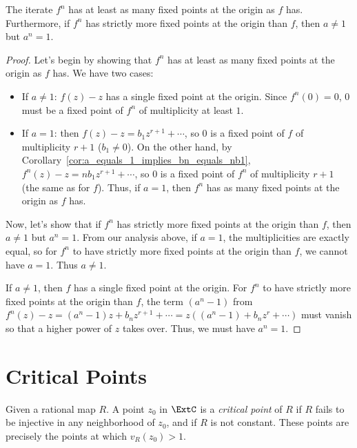 \begin{corollary}
    The iterate $f^n$ has at least as many fixed points at the origin as $f$
    has. Furthermore, if $f^n$ has strictly more fixed points at the origin than
    $f$, then $a \neq 1$ but $a^n = 1$.
\end{corollary}
\begin{proof}
    Let's begin by showing that $f^n$ has at least as many fixed points at the
    origin as $f$ has. We have two cases:
    \begin{itemize}
        \item If $a \neq 1$: $f(z) - z$ has a single fixed point at the origin.
        Since $f^n(0) = 0$, $0$ must be a fixed point of $f^n$ of multiplicity
        at least $1$.
        \item If $a = 1$: then $f(z) - z = b_1 z^{r+1} + \cdots$, so $0$ is a
        fixed point of $f$ of multiplicity $r + 1$ ($b_1 \neq 0$). On the other
        hand, by Corollary~\ref{cor:a_equals_1_implies_bn_equals_nb1}, $f^n(z) -
        z = n b_1 z^{r+1} + \cdots$, so $0$ is a fixed point of $f^n$ of
        multiplicity $r + 1$ (the same as for $f$). Thus, if $a = 1$, then $f^n$
        has as many fixed points at the origin as $f$ has.
    \end{itemize}

    Now, let's show that if $f^n$ has strictly more fixed points at the origin
    than $f$, then $a \neq 1$ but $a^n = 1$. From our analysis above, if $a =
    1$, the multiplicities are exactly equal, so for $f^n$ to have strictly more
    fixed points at the origin than $f$, we cannot have $a = 1$. Thus $a \neq
    1$.

    If $a \neq 1$, then $f$ has a single fixed point at the origin. For $f^n$ to
    have strictly more fixed points at the origin than $f$, the term $(a^n - 1)$
    from $f^n(z) - z = (a^n - 1)z + b_n z^{r+1} + \cdots = z((a^n - 1) + b_n z^r
    + \cdots)$ must vanish so that a higher power of $z$ takes over. Thus, we
    must have $a^n = 1$.
\end{proof}

\section{Critical Points}

\begin{definition}
    Given a rational map $R$. A point $z_0$ in $\ExtC$ is a \emph{critical
    point} of $R$ if $R$ fails to be injective in any neighborhood of $z_0$, and
    if $R$ is not constant. These points are precisely the points at which
    $v_R(z_0) > 1$.
\end{definition}

